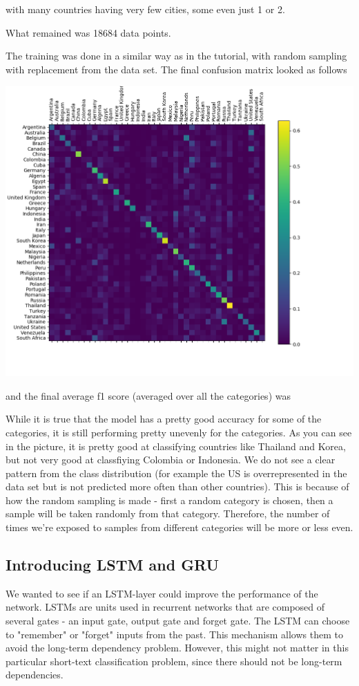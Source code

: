 \documentclass[runningheads]{llncs}
\begin{document}
with many countries having very few cities, some even just 1 or 2.

What remained was 18684 data points.

The training was done in a similar way as in the tutorial, with random sampling with replacement from the data set. The final confusion matrix looked as follows

\begin{center}
        \includegraphics[width=.5\textwidth]{../plots/confusion_matrix_initial.png}
\end{center}

and the final average f1 score (averaged over all the categories) was 

While it is true that the model has a pretty good accuracy for some of the categories, it is still performing pretty unevenly for the categories. As you can see in the picture, it is pretty good at classifying countries like Thailand and Korea, but not very good at classfiying Colombia or Indonesia. We do not see a clear pattern from the class distribution (for example the US is overrepresented in the data set but is not predicted more often than other countries). This is because of how the random sampling is made - first a random category is chosen, then a sample will be taken randomly from that category. Therefore, the number of times we're exposed to samples from different categories will be more or less even.

\subsection{Introducing LSTM and GRU}

We wanted to see if an LSTM-layer could improve the performance of the network. LSTMs are units used in recurrent networks that are composed of several gates - an input gate, output gate and forget gate. The LSTM can choose to "remember" or "forget" inputs from the past. This mechanism allows them to avoid the long-term dependency problem. However, this might not matter in this particular short-text classification problem, since there should not be long-term dependencies.
\end{document}
